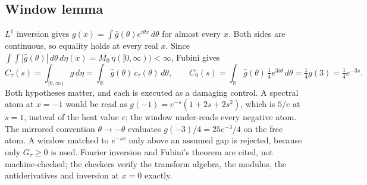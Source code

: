 \subsection{Window lemma}
\label{sec:av2-lemma}
$L^1$ inversion gives $g(x)=\int\hat g(\theta)e^{i\theta x}\,d\theta$ for
almost every $x$. Both sides are continuous, so equality holds at every real
$x$. Since
$\int\!\!\int|\hat g(\theta)|\,d\theta\,d\eta(x)=M_0\,\eta([0,\infty))<\infty$,
Fubini gives
\begin{equation}
 C_\tau(s)=\int_{[0,\infty)}g\,d\eta=\int_{\mathbb R}\hat g(\theta)\,c_\tau(\theta)\,d\theta,
 \qquad
 C_0(s)=\int_{\mathbb R}\hat g(\theta)\,\tfrac14e^{3i\theta}\,d\theta
 =\tfrac14g(3)=\tfrac14e^{-3s}.
 \label{eq:av2-lemma}
\end{equation}
Both hypotheses matter, and each is executed as a damaging control. A spectral
atom at $x=-1$ would be read as $g(-1)=e^{-s}(1+2s+2s^2)$, which is $5/e$ at
$s=1$, instead of the heat value $e$; the window under-reads every negative
atom. The mirrored convention $\theta\to-\theta$ evaluates
$g(-3)/4=25e^{-3}/4$ on the free atom. A window matched to $e^{-sx}$ only above
an assumed gap is rejected, because only $G_\tau\ge0$ is used. Fourier
inversion and Fubini's theorem are cited, not machine-checked; the checkers
verify the transform algebra, the modulus, the antiderivatives and inversion
at $x=0$ exactly.

